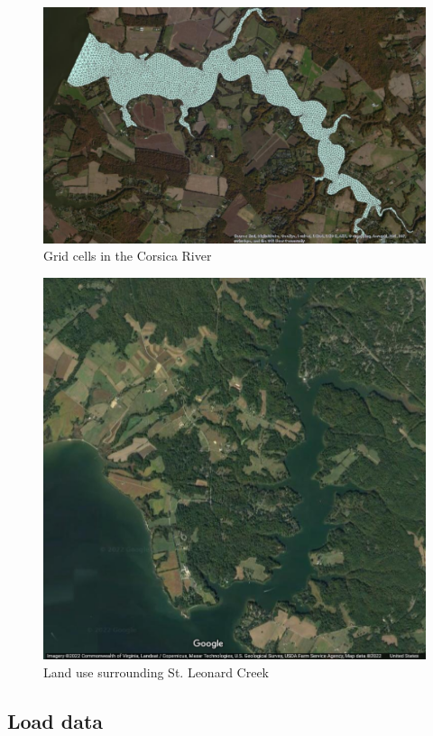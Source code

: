 \documentclass[
]{article}
\begin{document}
\begin{figure}[H]
  \includegraphics{Corsica_grid.png}
  \caption{Grid cells in the Corsica River}
\end{figure}

\begin{figure}[H]
  \includegraphics{StLeonardCreek.png}
  \caption{Land use surrounding St. Leonard Creek}
\end{figure}

\newpage
\onehalfspacing

\hypertarget{load-data}{%
\subsection{Load data}\label{load-data}}
\end{document}
